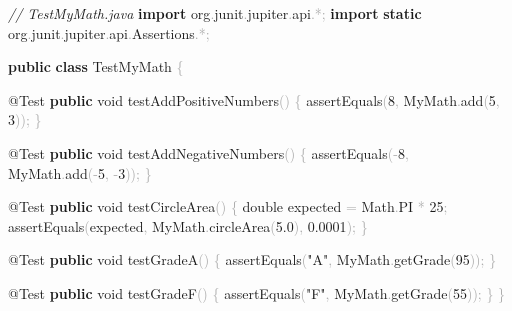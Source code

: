 \documentclass[
  justified,
  openright,
]{tufte-book}
\newcommand{\KeywordTok}[1]{\textcolor{CodeKeyword}{\textbf{#1}}}  %
\newcommand{\StringTok}[1]{\textcolor{CodeString}{#1}}              %
\newcommand{\CommentTok}[1]{\textcolor{CodeComment}{\textit{#1}}}  %
\newcommand{\CodeNumTok}[1]{\textcolor{CodeNumber}{#1}}             %
\newcommand{\CodeFuncTok}[1]{\textcolor{CodeKeyword}{#1}}           %
\newcommand{\CodeTypeTok}[1]{\textcolor{CodeType}{#1}}              %
\newcommand{\CodeAccentTok}[1]{\textcolor{CodeAccent}{#1}}          %
\newcommand{\OperatorTok}[1]{\textcolor{DarkGray}{#1}}              %
\newenvironment{Shaded}{%
  \begin{mdframed}[style=TufteCode]%
}{%
  \end{mdframed}%
}
\begin{document}
\begin{Shaded}
\begin{Highlighting}[]
\CommentTok{// TestMyMath.java}
\KeywordTok{import} \CodeAccentTok{org}\OperatorTok{.}\CodeAccentTok{junit}\OperatorTok{.}\CodeAccentTok{jupiter}\OperatorTok{.}\CodeAccentTok{api}\OperatorTok{.*;}
\KeywordTok{import} \KeywordTok{static}\CodeAccentTok{ org}\OperatorTok{.}\CodeAccentTok{junit}\OperatorTok{.}\CodeAccentTok{jupiter}\OperatorTok{.}\CodeAccentTok{api}\OperatorTok{.}\CodeAccentTok{Assertions}\OperatorTok{.*;}
 
\KeywordTok{public} \KeywordTok{class} TestMyMath \OperatorTok{\{}
 
    \CodeTypeTok{@Test}
    \KeywordTok{public} \CodeTypeTok{void} \CodeFuncTok{testAddPositiveNumbers}\OperatorTok{()} \OperatorTok{\{}
        \CodeFuncTok{assertEquals}\OperatorTok{(}\CodeNumTok{8}\OperatorTok{,} MyMath\OperatorTok{.}\CodeFuncTok{add}\OperatorTok{(}\CodeNumTok{5}\OperatorTok{,} \CodeNumTok{3}\OperatorTok{));}
    \OperatorTok{\}}
 
    \CodeTypeTok{@Test}
    \KeywordTok{public} \CodeTypeTok{void} \CodeFuncTok{testAddNegativeNumbers}\OperatorTok{()} \OperatorTok{\{}
        \CodeFuncTok{assertEquals}\OperatorTok{({-}}\CodeNumTok{8}\OperatorTok{,} MyMath\OperatorTok{.}\CodeFuncTok{add}\OperatorTok{({-}}\CodeNumTok{5}\OperatorTok{,} \OperatorTok{{-}}\CodeNumTok{3}\OperatorTok{));}
    \OperatorTok{\}}
 
    \CodeTypeTok{@Test}
    \KeywordTok{public} \CodeTypeTok{void} \CodeFuncTok{testCircleArea}\OperatorTok{()} \OperatorTok{\{}
        \CodeTypeTok{double} expected \OperatorTok{=} Math\OperatorTok{.}\CodeFuncTok{PI} \OperatorTok{*} \CodeNumTok{25}\OperatorTok{;}
        \CodeFuncTok{assertEquals}\OperatorTok{(}expected\OperatorTok{,} MyMath\OperatorTok{.}\CodeFuncTok{circleArea}\OperatorTok{(}\CodeNumTok{5.0}\OperatorTok{),} \CodeNumTok{0.0001}\OperatorTok{);}
    \OperatorTok{\}}
 
    \CodeTypeTok{@Test}
    \KeywordTok{public} \CodeTypeTok{void} \CodeFuncTok{testGradeA}\OperatorTok{()} \OperatorTok{\{}
        \CodeFuncTok{assertEquals}\OperatorTok{(}\StringTok{"A"}\OperatorTok{,} MyMath\OperatorTok{.}\CodeFuncTok{getGrade}\OperatorTok{(}\CodeNumTok{95}\OperatorTok{));}
    \OperatorTok{\}}
 
    \CodeTypeTok{@Test}
    \KeywordTok{public} \CodeTypeTok{void} \CodeFuncTok{testGradeF}\OperatorTok{()} \OperatorTok{\{}
        \CodeFuncTok{assertEquals}\OperatorTok{(}\StringTok{"F"}\OperatorTok{,} MyMath\OperatorTok{.}\CodeFuncTok{getGrade}\OperatorTok{(}\CodeNumTok{55}\OperatorTok{));}
    \OperatorTok{\}}
\OperatorTok{\}}
\end{Highlighting}
\end{Shaded}
\end{document}
